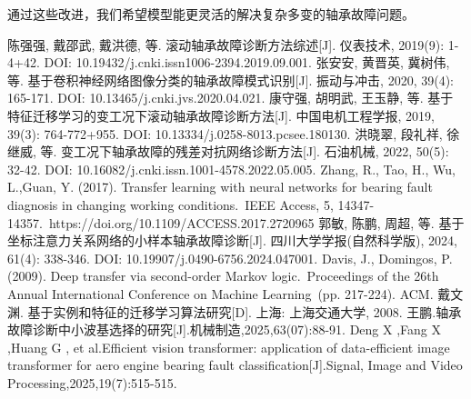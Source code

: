 \documentclass[a4paper]{CPIPC}
\numberwithin{equation}{section}
\begin{document}
通过这些改进，我们希望模型能更灵活的解决复杂多变的轴承故障问题。
\newpage
\begin{thebibliography}{11}
陈强强, 戴邵武, 戴洪德, 等. 滚动轴承故障诊断方法综述[J]. 仪表技术, 2019(9): 1-4+42. DOI: 10.19432/j.cnki.issn1006-2394.2019.09.001.
张安安, 黄晋英, 冀树伟, 等. 基于卷积神经网络图像分类的轴承故障模式识别[J]. 振动与冲击, 2020, 39(4): 165-171. DOI: 10.13465/j.cnki.jvs.2020.04.021. 
康守强, 胡明武, 王玉静, 等. 基于特征迁移学习的变工况下滚动轴承故障诊断方法[J]. 中国电机工程学报, 2019, 39(3): 764-772+955. DOI: 10.13334/j.0258-8013.pcsee.180130.
洪晓翠, 段礼祥, 徐继威, 等. 变工况下轴承故障的残差对抗网络诊断方法[J]. 石油机械, 2022, 50(5): 32-42. DOI: 10.16082/j.cnki.issn.1001-4578.2022.05.005.
Zhang, R., Tao, H., Wu, L.,Guan, Y. (2017). Transfer learning with neural networks for bearing fault diagnosis in changing working conditions. IEEE Access, 5, 14347-14357. https://doi.org/10.1109/ACCESS.2017.2720965 
郭敏, 陈鹏, 周超, 等. 基于坐标注意力关系网络的小样本轴承故障诊断[J]. 四川大学学报(自然科学版), 2024, 61(4): 338-346. DOI: 10.19907/j.0490-6756.2024.047001. 
Davis, J., Domingos, P. (2009). Deep transfer via second-order Markov logic. Proceedings of the 26th Annual International Conference on Machine Learning (pp. 217-224). ACM.
戴文渊. 基于实例和特征的迁移学习算法研究[D]. 上海: 上海交通大学, 2008.
王鹏.轴承故障诊断中小波基选择的研究[J].机械制造,2025,63(07):88-91.
Deng X ,Fang X ,Huang G , et al.Efficient vision transformer: application of data-efficient image transformer for aero engine bearing fault classification[J].Signal, Image and Video Processing,2025,19(7):515-515.
\end{thebibliography}


\newpage

\appendix
\end{document}
